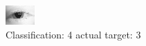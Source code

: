 \begin{figure}[h!]
\begin{center}
\includegraphics[width=0.60\columnwidth]{figures/ID81_class_4_target_3.png}
\end{center}
\caption{ Classification: 4 actual target: 3}
\label{fig:ID81_class_4_target_3}
\end{figure}
